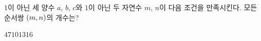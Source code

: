 $1$이 아닌 세 양수 $a$, $b$, $c$와 $1$이 아닌 두 자연수 $m$, $n$이 다음 조건을 만족시킨다. 모든 순서쌍 $(m{,}\mkern3mu\mathopen{}n)$의 개수는? 
\begin{choices32}{$4$}{$7$}{$10$}{$13$}{$16$}\end{choices32}
